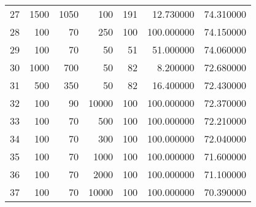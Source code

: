 \begin{tabular}{lrrrrrr}
27 & 1500 & 1050 & 100 & 191 & 12.730000 & 74.310000 \\
28 & 100 & 70 & 250 & 100 & 100.000000 & 74.150000 \\
29 & 100 & 70 & 50 & 51 & 51.000000 & 74.060000 \\
30 & 1000 & 700 & 50 & 82 & 8.200000 & 72.680000 \\
31 & 500 & 350 & 50 & 82 & 16.400000 & 72.430000 \\
32 & 100 & 90 & 10000 & 100 & 100.000000 & 72.370000 \\
33 & 100 & 70 & 500 & 100 & 100.000000 & 72.210000 \\
34 & 100 & 70 & 300 & 100 & 100.000000 & 72.040000 \\
35 & 100 & 70 & 1000 & 100 & 100.000000 & 71.600000 \\
36 & 100 & 70 & 2000 & 100 & 100.000000 & 71.100000 \\
37 & 100 & 70 & 10000 & 100 & 100.000000 & 70.390000 \\
\end{tabular}
